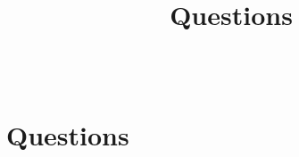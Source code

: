 \documentclass[hyperref={colorlinks=true,urlcolor=blue,linkcolor=.},aspectratio=1610,mathserif]{beamer}
\begin{document}
\begin{frame}
\begin{columns}[T]
\begin{center}
  \end{center}
 \end{columns}
\end{frame}

\section*{Questions}
\title{Questions}
\subtitle{}
\begin{frame}
 \titlepage
\end{frame}
\end{document}
